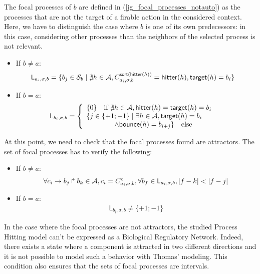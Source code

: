 The focal processes of $b$ are defined in (\ref{ig_focal_processes_notauto}) as the processes that are not the target of a firable action in the considered context. Here, we have to distinguish the case where $b$ is one of its own predecessors: in this case, considering other processes than the neighbors of the selected process is not relevant.
\begin{itemize}
  \item If $b \neq a$:
\begin{align}
\label{ig_focal_processes_notauto}
  \mathsf{L}_{a_i,\sigma,b} &= \{b_j \in \mathcal{S}_b \mid \nexists h \in \mathcal{A}, C^{\mathsf{sort}(\mathsf{hitter}(h))}_{a_i,\sigma,b} = \mathsf{hitter}(h), \mathsf{target}(h) = b_i\}
\end{align}
  \item If $b = a$:
\begin{align}
\label{ig_focal_processes_auto}
  \mathsf{L}_{b_i,\sigma,b} &=
    \left\{\begin{array}{l}
      \{0\} \quad \text{if } \nexists h \in \mathcal{A}, \mathsf{hitter}(h) = \mathsf{target}(h) = b_i \\
      \{j \in \{+1 ; -1\} \mid \exists h \in \mathcal{A}, \mathsf{target}(h) = b_i\\
      \quad\quad\quad\quad \wedge \mathsf{bounce}(h) = b_{i+j}\} \quad \text{else}
    \end{array}\right.
\end{align}
\end{itemize}

At this point, we need to check that the focal processes found are attractors. The set of focal processes has to verify the following:
\begin{itemize}
  \item If $b \neq a$:
\begin{align}
\label{ig_attractor_noauto}
  \forall c_i\rightarrow b_j\Rsh b_k \in \mathcal{A}, c_i = C^{c}_{a_i,\sigma,b}, \forall b_f \in \mathsf{L}_{a_i,\sigma,b}, |f-k| < |f-j|
\end{align}
  \item If $b = a$:
\begin{align}
\label{ig_attractor_auto}
  \mathsf{L}_{b_i,\sigma,b} \neq \{+1 ; -1\}
\end{align}
\end{itemize}
In the case where the focal processes are not attractors, the studied Process Hitting model can't be expressed as a Biological Regulatory Network. Indeed, there exists a state where a component is attracted in two different directions and it is not possible to model such a behavior with Thomas' modeling. This condition also ensures that the sets of focal processes are intervals.


